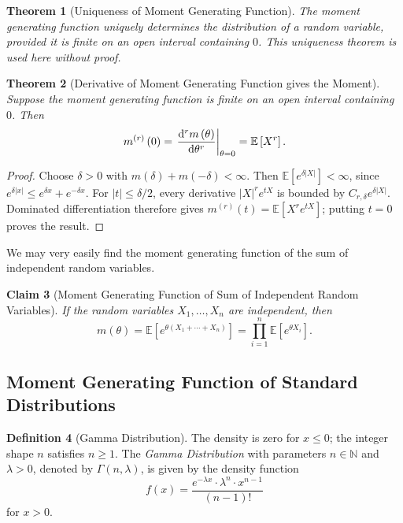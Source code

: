 \documentclass[11pt]{article}
\numberwithin{equation}{section}
\newtheorem{theorem}{Theorem}[section]
\newtheorem{claim}[theorem]{Claim}
\theoremstyle{definition}
\newtheorem{definition}[theorem]{Definition}
\theoremstyle{remark}
\newcommand{\pqty}[1]{\left(#1\right)}
\newcommand{\bqty}[1]{\left[#1\right]}
\newcommand{\NN}{\mathbb N}
\newcommand{\rightbar}[1]{\left.#1\right|}
\newcommand{\Expt}{\mathbb E}
\begin{document}
\begin{theorem}[Uniqueness of Moment Generating Function]\label{probability-theorem-022}
    \label{probability-thm:uniqueness-mgf}%
    The moment generating function uniquely determines the distribution of a random variable, provided it is finite on an open interval containing \(0\). This uniqueness theorem is used here without proof.
\end{theorem}

\begin{theorem}[Derivative of Moment Generating Function gives the Moment]\label{probability-theorem-023}
    \label{probability-thm:derivative-mgf-moment}%
    Suppose the moment generating function is finite on an open interval containing \(0\). Then
    \[
        m^{\pqty{r}} \pqty{0} = \rightbar{\dv[r]{m\pqty{\theta}}{\theta}}_{\theta = 0} = \Expt\bqty{X^r}.
    \]
\end{theorem}
\begin{proof}\label{probability-proof-077}
Choose \(\delta>0\) with \(m(\delta)+m(-\delta)<\infty\).
Then \(\Expt[e^{\delta|X|}]<\infty\), since
\(e^{\delta|x|}\le e^{\delta x}+e^{-\delta x}\).
For \(|t|\le\delta/2\), every derivative \(|X|^r e^{tX}\) is bounded
by \(C_{r,\delta}e^{\delta|X|}\). Dominated differentiation therefore gives
\(m^{(r)}(t)=\Expt[X^r e^{tX}]\); putting \(t=0\) proves the result.
\end{proof}

We may very easily find the moment generating function of the sum of independent random variables.

\begin{claim}[Moment Generating Function of Sum of Independent Random Variables]\label{probability-claim-005}
    \label{probability-claim:mgf-sum-independent}%
    If the random variables \(X_1, \ldots, X_n\) are independent, then
    \[
        m\pqty{\theta} = \Expt\bqty{e^{\theta \pqty{X_1 + \cdots + X_n}}} = \prod_{i = 1}^{n} \Expt\bqty{e^{\theta X_i}}.
    \]
\end{claim}

\subsection{Moment Generating Function of Standard Distributions}

\begin{definition}[Gamma Distribution]\label{probability-definition-063}
    \label{probability-def:gamma-distribution}
The density is zero for \(x\le0\); the integer shape \(n\) satisfies \(n\ge1\).
%
    The \emph{Gamma Distribution} with parameters \(n \in \NN\) and \(\lambda > 0\), denoted by \(\Gamma\pqty{n, \lambda}\), is given by the density function
    \[
        f\pqty{x} = \frac{e^{-\lambda x} \cdot \lambda^n \cdot x^{n - 1}}{\pqty{n - 1}!}
    \]
    for \(x > 0\).
\end{definition}
\end{document}
